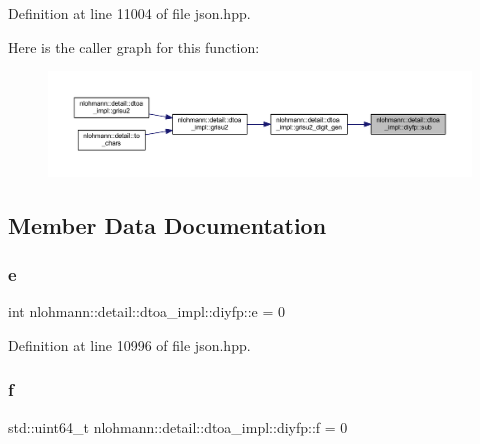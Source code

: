 Definition at line 11004 of file json.\+hpp.

Here is the caller graph for this function\+:
\nopagebreak
\begin{figure}[H]
\begin{center}
\leavevmode
\includegraphics[width=350pt]{structnlohmann_1_1detail_1_1dtoa__impl_1_1diyfp_aeb26771af54ad73598c1a0430d65d884_icgraph}
\end{center}
\end{figure}


\subsection{Member Data Documentation}
\mbox{\label{structnlohmann_1_1detail_1_1dtoa__impl_1_1diyfp_ae22e170815983961447c429f324c944d}} 
\subsubsection{\texorpdfstring{e}{e}}
{\footnotesize\ttfamily int nlohmann\+::detail\+::dtoa\+\_\+impl\+::diyfp\+::e = 0}



Definition at line 10996 of file json.\+hpp.

\mbox{\label{structnlohmann_1_1detail_1_1dtoa__impl_1_1diyfp_aea90459e340a231ca31d46946803ef51}} 
\subsubsection{\texorpdfstring{f}{f}}
{\footnotesize\ttfamily std\+::uint64\+\_\+t nlohmann\+::detail\+::dtoa\+\_\+impl\+::diyfp\+::f = 0}



